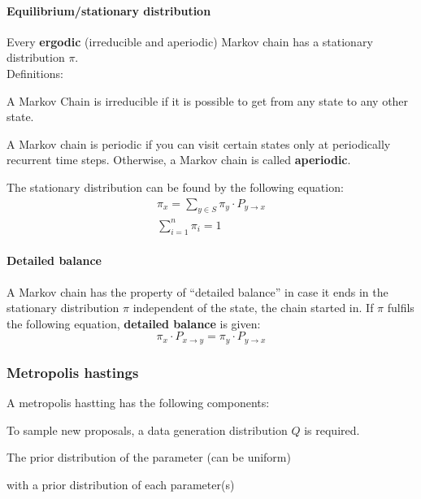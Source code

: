 \paragraph{Equilibrium/stationary distribution}
Every \textbf{ergodic} (irreducible and aperiodic) Markov chain has a stationary distribution $\pi$.\\
Definitions:
\begin{description}
	\tightlist
	\item[irreducible] A Markov Chain is irreducible if it is possible to get from any state to any other state.
	\item[periodic] A Markov chain is periodic if you can visit certain states only at periodically recurrent time steps. Otherwise, a Markov chain is called \textbf{aperiodic}.
\end{description}

The stationary distribution can be found by the following equation:
\begin{gather*}
\pi_x = \sum_{y\in S}\pi_y\cdot P_{y\rightarrow x}\\
\sum_{i=1}^{n}\pi_i = 1
\end{gather*}

\paragraph{Detailed balance}
A Markov chain has the property of ``detailed balance'' in case it ends in the stationary distribution $\pi$ independent of the state, the chain started in. If $\pi$ fulfils the following equation, \textbf{detailed balance} is given:
\begin{equation*}
\pi_x\cdot P_{x\rightarrow y} = \pi_y\cdot P_{y\rightarrow x}
\end{equation*}

\subsubsection{Metropolis hastings}
A metropolis hastting has the following components:
\begin{description}
	\tightlist
	\item[A data generating distribution $Q$] To sample new proposals, a data generation distribution $Q$ is required.
	\item[A prior distribution] The prior distribution of the parameter (can be uniform)
	\item[A posterior distribution] with a prior distribution of each parameter(s)
\end{description}

